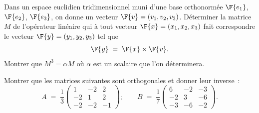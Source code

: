\documentclass[12pt,french,oneside,a4paper]{memoir} %
\begin{document}
\begin{exo}
Dans un espace euclidien tridimensionnel muni d'une base orthonormée $\F{e_1}$, $\F{e_2}$, $\F{e_3}$, on donne un vecteur $\F{v}=(v_1, v_2, v_3)$.  Déterminer la matrice $M$ de l'opérateur linéaire qui à tout vecteur $\F{x}=(x_1, x_2, x_3)$ fait correspondre le vecteur $\F{y}=(y_1,y_2,y_3)$ tel que 
\begin{equation*}
\F{y} \;=\; \F{x} \times \F{v}.
\end{equation*}
Montrer que $M^3= \alpha M$ où $\alpha$ est un scalaire que l'on déterminera.
\end{exo}

\begin{exo}
Montrer que les matrices suivantes sont orthogonales et donner 
leur inverse~:
\begin{equation*}
A \;=\; \frac{1}{3} \left( \begin{array}{rrr}
1 &-2 &2 \\
-2 &1 &2 \\
-2 &-2 &-1
\end{array} \right); \qquad
B \;=\; \frac{1}{7} \left( \begin{array}{rrr}
6 &-2 &-3 \\
-2 &3 &-6 \\
-3 &-6 &-2 \end{array} \right).
\end{equation*}
\end{exo}
\end{document}
